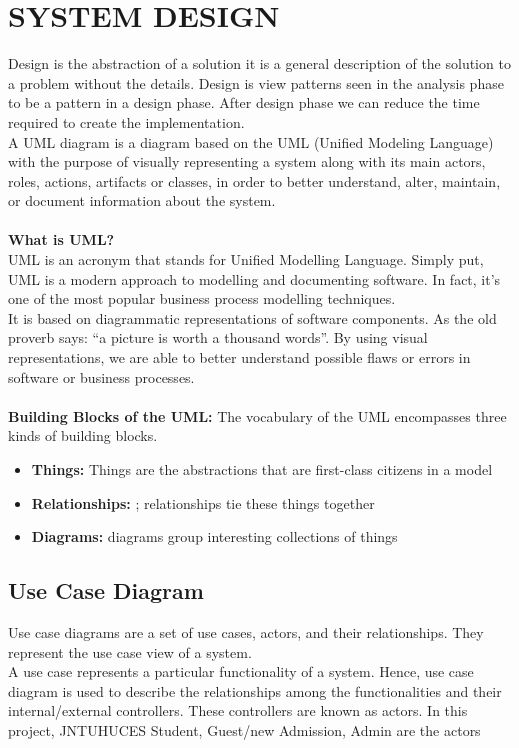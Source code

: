 \documentclass[12pt,a4paper]{report}
\begin{document}
\newpage
\chapter{SYSTEM DESIGN}
Design is the abstraction of a solution it is a general description of the solution to a problem without the details. Design is view patterns seen in the analysis phase to be a pattern in a design phase. After design phase we can reduce the time required to create the implementation.\\
\hspace*{35pt}A UML diagram is a diagram based on the UML (Unified Modeling Language) with the purpose of visually representing a system along with its main actors, roles, actions, artifacts or classes, in order to better understand, alter, maintain, or document information about the system.\\ \\
\textbf{What is UML?}\\
UML is an acronym that stands for Unified Modelling Language. Simply put, UML is a modern approach to modelling and documenting software. In fact, it’s one of the most popular business process modelling techniques.\\
It is based on diagrammatic representations of software components. As the old proverb says: “a picture is worth a thousand words”. By using visual representations, we are able to better understand possible flaws or errors in software or business processes.\\\\
\textbf{Building Blocks of the UML:} The vocabulary of the UML encompasses three kinds of building blocks.
\begin{itemize}
	\item \textbf{Things:} Things are the abstractions that are first-class citizens in a model
	\item \textbf{Relationships:} ; relationships tie these
	things together
	\item \textbf{Diagrams:} diagrams group interesting collections of things
\end{itemize}
\section{Use Case Diagram}
Use case diagrams are a set of use cases, actors, and their relationships. They represent the use case view of a system.\\
\hspace*{35pt}A use case represents a particular functionality of a system. Hence, use case diagram is used to describe the relationships among the functionalities and their internal/external controllers. These controllers are known as actors. In this project, JNTUHUCES Student, Guest/new Admission, Admin are the actors\\
 
\end{document}
